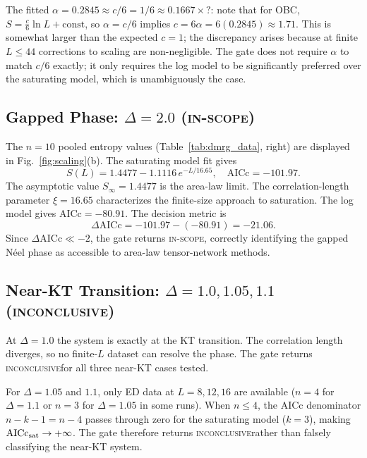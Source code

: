 \documentclass[11pt,letterpaper]{article}
\newcommand{\dAICc}{\Delta\mathrm{AICc}}
\newcommand{\Sinf}{S_{\infty}}
\newcommand{\Neel}{N\'{e}el}
\newcommand{\inscope}{\textsc{in-scope}}
\newcommand{\inconclusive}{\textsc{inconclusive}}
\begin{document}
The fitted $\alpha = 0.2845 \approx c/6 = 1/6 \approx 0.1667 \times ? $: note
that for OBC, $S = \frac{c}{6}\ln L + \text{const}$, so $\alpha = c/6$ implies
$c = 6\alpha = 6(0.2845) \approx 1.71$.  This is somewhat larger than the
expected $c=1$; the discrepancy arises because at finite $L \le 44$ corrections
to scaling are non-negligible.  The gate does not require $\alpha$ to match $c/6$
exactly; it only requires the log model to be significantly preferred over the
saturating model, which is unambiguously the case.

\subsection{Gapped Phase: $\Delta = 2.0$ (\inscope)}
\label{sec:delta20}

The $n=10$ pooled entropy values (Table~\ref{tab:dmrg_data}, right) are
displayed in Fig.~\ref{fig:scaling}(b).  The saturating model fit gives
\begin{equation}
  S(L) = 1.4477 - 1.1116\,e^{-L/16.65},\quad \mathrm{AICc} = -101.97.
  \label{eq:satfit20}
\end{equation}
The asymptotic value $\Sinf = 1.4477$ is the area-law limit.  The
correlation-length parameter $\xi = 16.65$ characterizes the finite-size
approach to saturation.  The log model gives $\mathrm{AICc} = -80.91$.
The decision metric is
\begin{equation}
  \dAICc = -101.97 - (-80.91) = -21.06.
  \label{eq:daicc20}
\end{equation}
Since $\dAICc \ll -2$, the gate returns \inscope, correctly identifying
the gapped \Neel{} phase as accessible to area-law tensor-network methods.

\subsection{Near-KT Transition: $\Delta = 1.0, 1.05, 1.1$ (\inconclusive)}
\label{sec:nearkT}

At $\Delta = 1.0$ the system is exactly at the KT transition.  The
correlation length diverges, so no finite-$L$ dataset can resolve the
phase.  The gate returns \inconclusive for all three near-KT cases tested.

For $\Delta = 1.05$ and $1.1$, only ED data at $L = 8, 12, 16$ are
available ($n=4$ for $\Delta=1.1$ or $n=3$ for $\Delta=1.05$ in some
runs).  When $n \le 4$, the AICc denominator $n - k - 1 = n - 4$ passes
through zero for the saturating model ($k=3$), making
$\mathrm{AICc}_{\rm sat} \to +\infty$.  The gate therefore returns
\inconclusive rather than falsely classifying the near-KT system.
\end{document}
